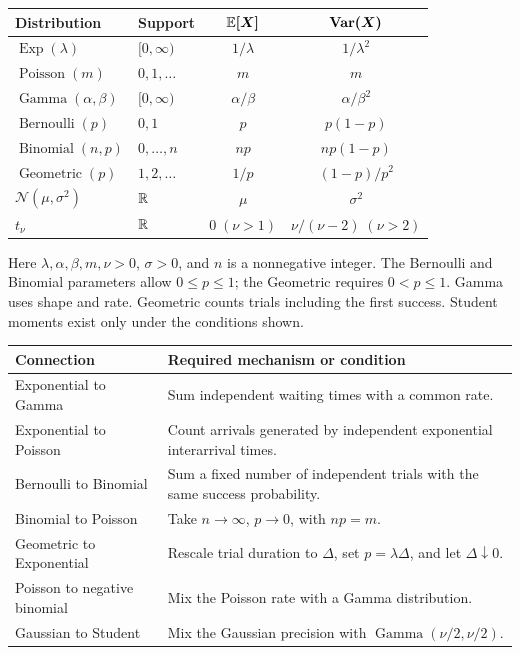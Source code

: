 \begin{center}
\renewcommand{\arraystretch}{1.5}
\begin{tabularx}{\textwidth}{@{}L{0.31\textwidth}Ycc@{}}
\toprule
\textbf{Distribution} & \textbf{Support} &
  \(\boldsymbol{\mathbb{E}[X]}\) & \(\boldsymbol{\operatorname{Var}(X)}\)\\
\midrule
\(\operatorname{Exp}(\lambda)\) & \([0,\infty)\) &
  \(1/\lambda\) & \(1/\lambda^2\)\\
\(\operatorname{Poisson}(m)\) & \(0,1,\ldots\) & \(m\) & \(m\)\\
\(\operatorname{Gamma}(\alpha,\beta)\) & \([0,\infty)\) &
  \(\alpha/\beta\) & \(\alpha/\beta^2\)\\
\(\operatorname{Bernoulli}(p)\) & \(0,1\) & \(p\) & \(p(1-p)\)\\
\(\operatorname{Binomial}(n,p)\) & \(0,\ldots,n\) &
  \(np\) & \(np(1-p)\)\\
\(\operatorname{Geometric}(p)\) & \(1,2,\ldots\) &
  \(1/p\) & \((1-p)/p^2\)\\
\(\mathcal N(\mu,\sigma^2)\) & \(\mathbb{R}\) & \(\mu\) & \(\sigma^2\)\\
\(t_\nu\) & \(\mathbb{R}\) &
  \(0\;(\nu>1)\) & \(\nu/(\nu-2)\;(\nu>2)\)\\
\bottomrule
\end{tabularx}
\end{center}
Here \(\lambda,\alpha,\beta,m,\nu>0\), \(\sigma>0\), and \(n\) is a
nonnegative integer. The Bernoulli and Binomial parameters allow
\(0\le p\le1\); the Geometric requires \(0<p\le1\).
Gamma uses shape and rate. Geometric counts trials including the first
success. Student moments exist only under the conditions shown.

\begin{center}
\begin{tabularx}{\textwidth}{@{}L{0.38\textwidth}Y@{}}
\toprule
\textbf{Connection} & \textbf{Required mechanism or condition}\\
\midrule
Exponential to Gamma & Sum independent waiting times with a common rate.\\
Exponential to Poisson & Count arrivals generated by independent exponential
  interarrival times.\\
Bernoulli to Binomial & Sum a fixed number of independent trials with the
  same success probability.\\
Binomial to Poisson & Take \(n\to\infty\), \(p\to0\), with \(np=m\).\\
Geometric to Exponential & Rescale trial duration to \(\Delta\), set
  \(p=\lambda\Delta\), and let \(\Delta\downarrow0\).\\
Poisson to negative binomial & Mix the Poisson rate with a Gamma distribution.\\
Gaussian to Student & Mix the Gaussian precision with
  \(\operatorname{Gamma}(\nu/2,\nu/2)\).\\
\bottomrule
\end{tabularx}
\end{center}

